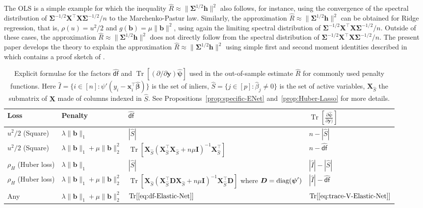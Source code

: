 \documentclass[11pt]{amsart}
\numberwithin{equation}{section}
\numberwithin{equation}{section}
\def\diag{\hbox{\rm diag}}
\DeclareMathOperator{\trace}{Tr}
\def\mathbold{\boldsymbol} %
\def\bb{\mathbold{b}}\def\bhat{\widehat{b}}\def\btil{\widetilde{b}}
\def\bD{\mathbold{D}}\def\calD{{\cal D}}\def\scrD{{\mathscr D}}\def\Dhat{\widehat{D}}\def\Dtil{{\widetilde D}}
\def\bh{\mathbold{h}}\def\hhat{\widehat{h}}\def\htil{\widetilde{h}}
\def\bI{\mathbold{I}}\def\hbI{{\widehat{\bI}}}\def\tbI{{\widetilde{\bI}}}
\def\bx{\mathbold{x}}\def\xhat{\widehat{x}}\def\xtil{\widetilde{x}}\def\xbar{{\overline x}}\def\vbx{{\bf x}}
\def\bX{\mathbold{X}}\def\hbX{{\widehat{\bX}}}\def\tbX{{\widetilde{\bX}}}\def\bXbar{{\overline \bX}}
\def\by{\mathbold{y}}\def\yhat{\widehat{y}}\def\ytil{\widetilde{y}}\def\ybar{{\overline y}}\def\vby{{\bf y}}
\def\bbeta{\mathbold{\beta}}\def\betahat{\widehat{\beta}}\def\hbeta{\widehat{\beta}}
\def\hbbeta{{{\widehat{\bbeta}}}}
\def\bSigma{\mathbold{\Sigma}}\def\hbSigma{{\widehat{\bSigma}}}
\def\bpsi{\mathbold{\psi}}\def\psihat{\widehat{\psi}}\def\hpsi{\widehat{\psi}}
\def\hbpsi{{\widehat{\bpsi}}}\def\tbpsi{{\widetilde{\bpsi}}}
\def\calD{{\cal D}}
\def\df{{\hat{\mathsf{df}}}{}}
\newcommand\pb[1]{{ #1 }}
\begin{document}
The OLS is a simple example for which the inequality
$\hat R\approx \|\bSigma^{1/2}\bh\|^2$
also follows, for instance, using
the convergence of the \pb{spectral distribution} of
$\bSigma^{-1/2}\bX^\top\bX\bSigma^{-1/2}/n$
to the Marchenko-Pastur law. Similarly, the approximation
$\hat R\approx \|\bSigma^{1/2}\bh\|^2$ can be obtained
for Ridge regression, that is, $\rho(u)=u^2/2$ and $g(\bb)=\mu\|\bb\|^2$,
using again the limiting spectral distribution of
$\bSigma^{-1/2}\bX^\top\bX\bSigma^{-1/2}/n$.
Outside of these cases, the approximation
$\hat R\approx \|\bSigma^{1/2}\bh\|^2$
\pb{does not directly follow
from the spectral distribution of 
$\bSigma^{-1/2}\bX^\top\bX\bSigma^{-1/2}/n$.}
The present paper develops the theory to explain
the approximation $\hat R \approx \|\bSigma^{1/2}\bh\|^2$
using simple first and second moment identities 
described in  which contains
a proof sketch of .



\begin{table}[]
    \begin{tabular}{@{}|l|l|p{5.7cm}|l|@{}}
\toprule
Loss & Penalty  & $\df$ & $\trace[\frac{\partial\hbpsi}{\partial\by)}]$  \\ \toprule
 $u^2/2$ (Square) & $\lambda\|\bb\|_1$ & $|\hat S|$  & $n-|\hat S|$ \\ \midrule
 $u^2/2$ (Square) & $\lambda\|\bb\|_1 + \mu\|\bb\|_2^2$ &
 $\trace[\bX_{\hat S}(\bX_{\hat S}^\top\bX_{\hat S}+n\mu\bI)^{-1}\bX^\top_{\hat S}]$
                  & $n-\df$  \\ \midrule
 $\rho_H$ (Huber loss) & $\lambda\|\bb\|_1$ & $|\hat S|$ & $|\hat I| - |\hat S|$  \\ \midrule
 $\rho_H$ (Huber loss) & $\lambda\|\bb\|_1 + \mu\|\bb\|_2^2$ &
 $\trace[\bX_{\hat S}(\bX_{\hat S}^\top\bD\bX_{\hat S}+n\mu\bI)^{-1}\bX^\top_{\hat S}\bD]$ \newline where $\bD=\diag(\bpsi')$
 & $|\hat I| - \df$  \\ \midrule
 Any & $\lambda\|\bb\|_1 + \mu\|\bb\|_2^2$ &
 $\trace[\eqref{eq:df-Elastic-Net}]$
     &
 $\trace[\eqref{eq:trace-V-Elastic-Net}]$
 \\
 \bottomrule
\end{tabular}
\caption[Explicit formulae for $\df$ and $\trace((\partial/\partial\mathbf{y})\mathbf{\hat\psi})$]{Explicit formulae for the factors $\df$ and
    $\trace[(\partial/\partial\by)\hbpsi]$ used
    in the out-of-sample estimate $\hat R$
    for commonly used penalty functions.
    Here $\hat I =\{i\in[n]: \psi'(y_i-\bx_i^\top\hbbeta)\}$ is the
    set of inliers, $\hat S=\{j\in [p]:\hat\beta_j \ne 0\}$ is the set
    of active variables, $\bX_{\hat S}$ the submatrix of $\bX$
    made of columns indexed in $\hat S$.
See Propositions~\ref{prop:specific-ENet} and~\ref{prop:Huber-Lasso} for more details.
}
\label{tab:my-table}
\end{table}
\end{document}

